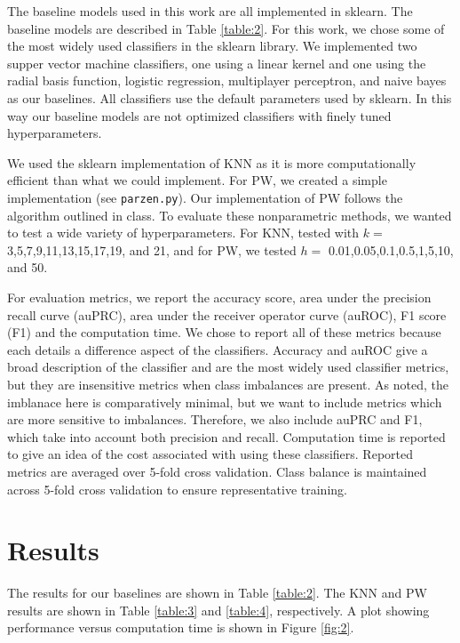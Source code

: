 \documentclass[12pt]{article}
\begin{document}
	The baseline models used in this work are all implemented in sklearn. The baseline models are described in Table \ref{table:2}. For this work, we chose some of the most widely used classifiers in the sklearn library. We implemented two supper vector machine classifiers, one using a linear kernel and one using the radial basis function, logistic regression, multiplayer perceptron, and naive bayes as our baselines. All classifiers use the default parameters used by sklearn. In this way our baseline models are not optimized classifiers with finely tuned hyperparameters. 
	
	We used the sklearn implementation of KNN as it is more computationally efficient than what we could implement. For PW, we created a simple implementation (see \texttt{parzen.py}). Our implementation of PW follows the algorithm outlined in class. To evaluate these nonparametric methods, we wanted to test a wide variety of hyperparameters. For KNN, tested with $k=$3,5,7,9,11,13,15,17,19, and 21, and for PW, we tested $h =$ 0.01,0.05,0.1,0.5,1,5,10, and 50.
	
    For evaluation metrics, we report the accuracy score, area under the precision recall curve (auPRC), area under the receiver operator curve (auROC), F1 score (F1) and the computation time. We chose to report all of these metrics because each details a difference aspect of the classifiers. Accuracy and auROC give a broad description of the classifier and are the most widely used classifier metrics, but they are insensitive metrics when class imbalances are present. As noted, the imblanace here is comparatively minimal, but we want to include metrics which are more sensitive to imbalances. Therefore, we also include auPRC and F1, which take into account both precision and recall. Computation time is reported to give an idea of the cost associated with using these classifiers. Reported metrics are averaged over 5-fold cross validation. Class balance is maintained across 5-fold cross validation to ensure representative training. 
		
	

	\section{Results}
	
    The results for our baselines are shown in Table \ref{table:2}. The KNN and PW results are shown in Table \ref{table:3} and \ref{table:4}, respectively. A plot showing performance versus computation time is shown in Figure \ref{fig:2}.
    
\end{document}
